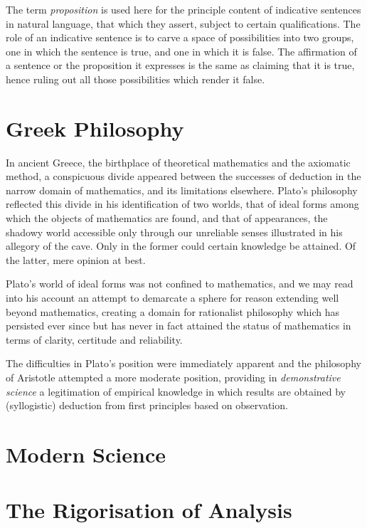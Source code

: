 The term \emph{proposition} is used here for the principle content of indicative sentences in natural language, that which they assert, subject to certain qualifications.
The role of an indicative sentence is to carve a space of possibilities into two groups, one in which the sentence is true, and one in which it is false.
The affirmation of a sentence or the proposition it expresses is the same as claiming that it is true, hence ruling out all those possibilities which render it false.

\section{Greek Philosophy}
  
In ancient Greece, the birthplace of theoretical mathematics and the axiomatic method, a conspicuous divide appeared between the successes of deduction in the narrow domain of mathematics, and its limitations elsewhere.
Plato's philosophy reflected this divide in his identification of two worlds, that of ideal forms among which the objects of mathematics are found, and that of appearances, the shadowy world accessible only through our unreliable senses illustrated in his allegory of the cave.
Only in the former could certain knowledge be attained.
Of the latter, mere opinion at best.

Plato's world of ideal forms was not confined to mathematics, and we may read into his account an attempt to demarcate a sphere for reason extending well beyond mathematics, creating a domain for rationalist philosophy which has persisted ever since but has never in fact attained the status of mathematics in terms of clarity, certitude and reliability.

The difficulties in Plato's position were immediately apparent and the philosophy of Aristotle attempted a more moderate position, providing in \emph{demonstrative science} a legitimation of empirical knowledge in which results are obtained by (syllogistic) deduction from first principles based on observation.

\section{Modern Science}

\section{The Rigorisation of Analysis}

